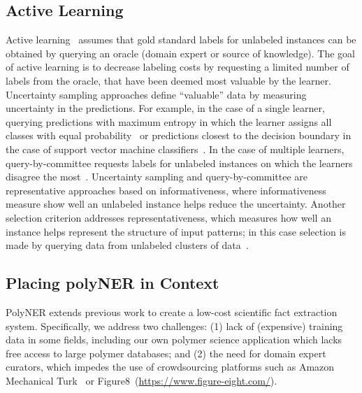 \subsection{Active Learning}
Active learning~\cite{zhou2017brief} assumes that gold standard labels for unlabeled instances can be obtained by
querying an oracle (domain expert or source of knowledge).
The goal of active learning is to decrease labeling costs by requesting a limited number of labels from the oracle, that have been deemed most valuable by the learner.
Uncertainty sampling approaches define ``valuable'' data by measuring uncertainty in the predictions.
For example, in the case of a single learner, querying predictions with maximum entropy in which the learner assigns all classes with equal probability~\cite{lewis1994heterogeneous} or predictions closest to the decision boundary in the case of support vector machine classifiers~\cite{campbell2000query}.
In the case of multiple learners, query-by-committee requests labels for unlabeled instances on which the learners disagree the most~\cite{seung1992query}.
Uncertainty sampling and query-by-committee are representative approaches based on informativeness, where informativeness measure show well an unlabeled instance helps reduce the uncertainty. 
Another selection criterion addresses representativeness, which measures how well an instance helps represent the structure of input patterns; in this case selection is made by querying data from unlabeled clusters of data~\cite{nguyen2004active,dasgupta2008hierarchical}.


\subsection{Placing polyNER in Context}
PolyNER extends previous work to create a low-cost scientific fact extraction system. 
Specifically, we address two challenges: 
(1) lack of (expensive) training data in some fields, including our own polymer science application which lacks free access to large polymer databases; and 
(2) the need for domain expert curators, which impedes the use of crowdsourcing platforms such as Amazon Mechanical Turk~\cite{buhrmester2011amazon} or Figure8~(\url{https://www.figure-eight.com/}).

